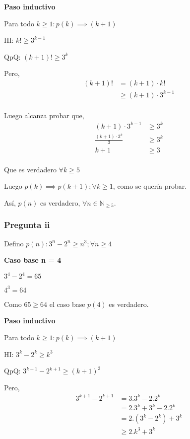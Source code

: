 \textbf{Paso inductivo}

Para todo $k \geq 1: p(k) \implies (k+1)$

HI: $k! \geq 3^{k-1}$

QpQ: $ (k+1)! \geq 3^{k}$

Pero,
\begin{align*}
    (k+1)! &= (k+1) \cdot k! \\
    &\geq (k+1) \cdot 3^{k-1} \\
\end{align*}

Luego alcanza probar que,
\begin{align*}
    (k+1) \cdot 3^{k-1} &\geq 3^{k} \\
    \frac{(k+1)\cdot 3^k}{3} &\geq 3^{k} \\
    k+1 &\geq 3 \\
\end{align*}

Que es verdadero $\forall k \geq 5$

Luego $p(k) \implies p(k+1); \forall k \geq 1$, como se quería probar.

Así, $p(n)$ es verdadero, $\forall n \in \mathbb{N}_{\geq 5}$.

\subsubsection{Pregunta ii}

Defino $ p(n): 3^n - 2^n \geq n^3; \forall n \geq 4 $

\textbf{Caso base n = 4}

$3^4 - 2^4 = 65$

$ 4^3 = 64$

Como $ 65 \geq 64 $ el caso base $p(4)$ es verdadero.

\textbf{Paso inductivo}

Para todo $k \geq 1: p(k) \implies (k+1)$

HI: $3^k - 2^k \geq k^3$

QpQ: $ 3^{k+1} - 2^{k+1} \geq (k+1)^3$

Pero,
\begin{align*}
    3^{k+1} - 2^{k+1} &= 3.3^k - 2.2^k \\
    &= 2.3^k + 3^k - 2.2^k \\
    &= 2.(3^k - 2^k) + 3^k \\
    &\geq 2.k^3 + 3^k \\
\end{align*}

